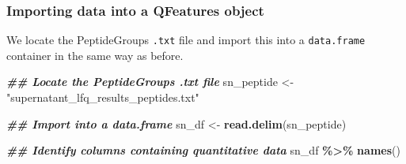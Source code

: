 \documentclass[9pt,a4paper,]{extarticle}
\newenvironment{Shaded}{\begin{snugshade}}{\end{snugshade}}
\newcommand{\DocumentationTok}[1]{\textcolor[rgb]{0.56,0.35,0.01}{\textbf{\textit{#1}}}}
\newcommand{\FunctionTok}[1]{\textcolor[rgb]{0.13,0.29,0.53}{\textbf{#1}}}
\newcommand{\NormalTok}[1]{#1}
\newcommand{\OtherTok}[1]{\textcolor[rgb]{0.56,0.35,0.01}{#1}}
\newcommand{\SpecialCharTok}[1]{\textcolor[rgb]{0.81,0.36,0.00}{\textbf{#1}}}
\newcommand{\StringTok}[1]{\textcolor[rgb]{0.31,0.60,0.02}{#1}}
\begin{document}
\subsubsection{Importing data into a QFeatures object}\label{importing-data-into-a-qfeatures-object}

We locate the PeptideGroups \texttt{.txt} file and import this into a \texttt{data.frame}
container in the same way as before.

\begin{Shaded}
\begin{Highlighting}[]
\DocumentationTok{\#\# Locate the PeptideGroups .txt file}
\NormalTok{sn\_peptide }\OtherTok{\textless{}{-}} \StringTok{"supernatant\_lfq\_results\_peptides.txt"}

\DocumentationTok{\#\# Import into a data.frame}
\NormalTok{sn\_df }\OtherTok{\textless{}{-}} \FunctionTok{read.delim}\NormalTok{(sn\_peptide)}

\DocumentationTok{\#\# Identify columns containing quantitative data}
\NormalTok{sn\_df }\SpecialCharTok{\%\textgreater{}\%}
  \FunctionTok{names}\NormalTok{()}
\end{Highlighting}
\end{Shaded}
\end{document}
